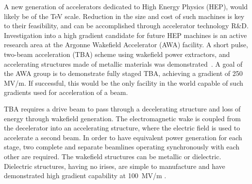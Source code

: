 \documentclass{iitthesis}
\begin{document}
 \label{sec:motivation}
A new generation of accelerators dedicated to High Energy Physics
(HEP), would likely be of the TeV scale. Reduction in the size and cost
of such machines is key to their feasibility, and can be accomplished
through accelerator technology R\&D. Investigation into a 
high gradient candidate for future HEP machines is an active research area
at the Argonne Wakefield Accelerator (AWA) facility. A
short pulse, two-beam acceleration (TBA) scheme using 
wakefield power extractors, and accelerating structures made 
of metallic materials was demonstrated~\cite{recent-tba}. 
A goal of the AWA group is to demonstrate fully staged TBA, 
achieving a gradient of 250 MV/m. If successful, this would
be the only facility in the world capable of such gradients used for
acceleration of a beam.

TBA requires a drive beam to pass through a decelerating structure and
loss of energy through wakefield generation. The electromagnetic wake
is coupled from the decelerator into an accelerating structure, where
the electric field is used to accelerate a second beam. In order to have equivalent power 
generation for each stage, two complete and separate beamlines 
operating synchronously with each other are required.  
The wakefield structures can be metallic or dielectric. Dielectric
structures, having no irises, are simple to manufacture and have demonstrated
high gradient capability at \SI{100}{MV/m} \cite{WeiPaper}. 
\end{document}
